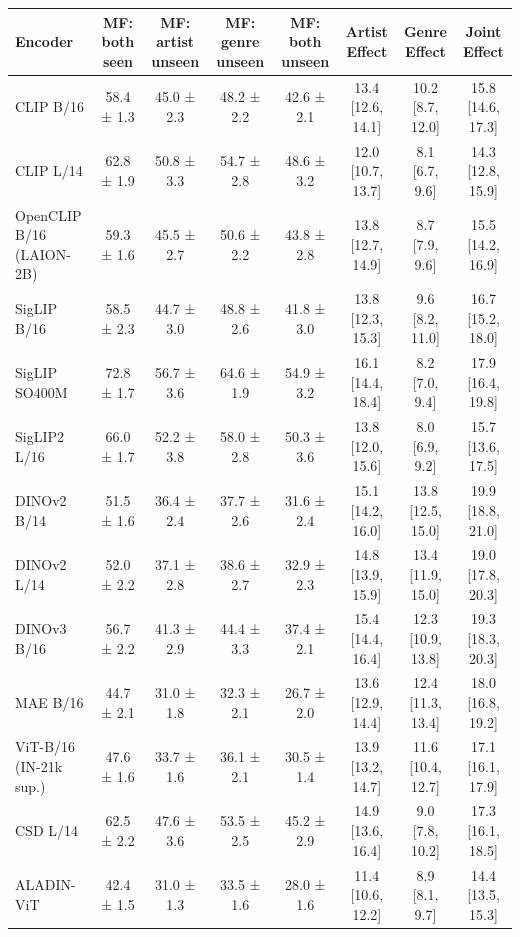 \begin{tabular}{lccccccc}
\toprule
Encoder & MF: both seen & MF: artist unseen & MF: genre unseen & MF: both unseen & Artist Effect & Genre Effect & Joint Effect \\
\midrule
CLIP B/16 & 58.4 ± 1.3 & 45.0 ± 2.3 & 48.2 ± 2.2 & 42.6 ± 2.1 & 13.4 [12.6, 14.1] & 10.2 [8.7, 12.0] & 15.8 [14.6, 17.3] \\
CLIP L/14 & 62.8 ± 1.9 & 50.8 ± 3.3 & 54.7 ± 2.8 & 48.6 ± 3.2 & 12.0 [10.7, 13.7] & 8.1 [6.7, 9.6] & 14.3 [12.8, 15.9] \\
OpenCLIP B/16 (LAION-2B) & 59.3 ± 1.6 & 45.5 ± 2.7 & 50.6 ± 2.2 & 43.8 ± 2.8 & 13.8 [12.7, 14.9] & 8.7 [7.9, 9.6] & 15.5 [14.2, 16.9] \\
SigLIP B/16 & 58.5 ± 2.3 & 44.7 ± 3.0 & 48.8 ± 2.6 & 41.8 ± 3.0 & 13.8 [12.3, 15.3] & 9.6 [8.2, 11.0] & 16.7 [15.2, 18.0] \\
SigLIP SO400M & 72.8 ± 1.7 & 56.7 ± 3.6 & 64.6 ± 1.9 & 54.9 ± 3.2 & 16.1 [14.4, 18.4] & 8.2 [7.0, 9.4] & 17.9 [16.4, 19.8] \\
SigLIP2 L/16 & 66.0 ± 1.7 & 52.2 ± 3.8 & 58.0 ± 2.8 & 50.3 ± 3.6 & 13.8 [12.0, 15.6] & 8.0 [6.9, 9.2] & 15.7 [13.6, 17.5] \\
DINOv2 B/14 & 51.5 ± 1.6 & 36.4 ± 2.4 & 37.7 ± 2.6 & 31.6 ± 2.4 & 15.1 [14.2, 16.0] & 13.8 [12.5, 15.0] & 19.9 [18.8, 21.0] \\
DINOv2 L/14 & 52.0 ± 2.2 & 37.1 ± 2.8 & 38.6 ± 2.7 & 32.9 ± 2.3 & 14.8 [13.9, 15.9] & 13.4 [11.9, 15.0] & 19.0 [17.8, 20.3] \\
DINOv3 B/16 & 56.7 ± 2.2 & 41.3 ± 2.9 & 44.4 ± 3.3 & 37.4 ± 2.1 & 15.4 [14.4, 16.4] & 12.3 [10.9, 13.8] & 19.3 [18.3, 20.3] \\
MAE B/16 & 44.7 ± 2.1 & 31.0 ± 1.8 & 32.3 ± 2.1 & 26.7 ± 2.0 & 13.6 [12.9, 14.4] & 12.4 [11.3, 13.4] & 18.0 [16.8, 19.2] \\
ViT-B/16 (IN-21k sup.) & 47.6 ± 1.6 & 33.7 ± 1.6 & 36.1 ± 2.1 & 30.5 ± 1.4 & 13.9 [13.2, 14.7] & 11.6 [10.4, 12.7] & 17.1 [16.1, 17.9] \\
CSD L/14 & 62.5 ± 2.2 & 47.6 ± 3.6 & 53.5 ± 2.5 & 45.2 ± 2.9 & 14.9 [13.6, 16.4] & 9.0 [7.8, 10.2] & 17.3 [16.1, 18.5] \\
ALADIN-ViT & 42.4 ± 1.5 & 31.0 ± 1.3 & 33.5 ± 1.6 & 28.0 ± 1.6 & 11.4 [10.6, 12.2] & 8.9 [8.1, 9.7] & 14.4 [13.5, 15.3] \\
\bottomrule
\end{tabular}
